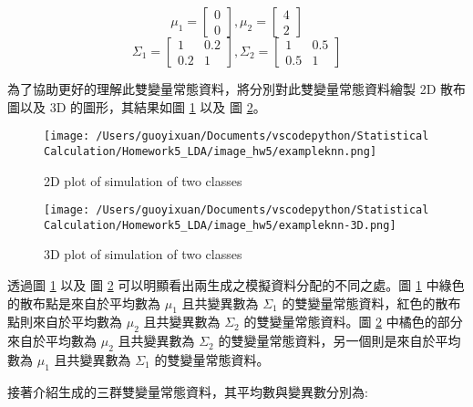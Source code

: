 $$ \mu_1 = \left[
            \begin{array}{clr}
                0  \\
                0 
            \end{array} \right] ,
            \mu_2 = \left[
            \begin{array}{clr}
                4  \\
                2 
            \end{array} \right] $$ 
$$ \Sigma_1 = \left[
            \begin{array}{clr}
                1 & 0.2  \\
                0.2 & 1
            \end{array} \right] ,
            \Sigma_2 = \left[
            \begin{array}{clr}
                1 & 0.5  \\
                0.5 & 1 
            \end{array} \right]  $$  

為了協助更好的理解此雙變量常態資料，將分別對此雙變量常態資料繪製 2D 散布圖以及 3D 的圖形，其結果如圖 \ref{fig:knn2D} 以及 圖 \ref{fig:knn3D}。

\begin{figure}[H]
    \centering
        \texttt{[image: /Users/guoyixuan/Documents/vscodepython/Statistical Calculation/Homework5\_LDA/image\_hw5/exampleknn.png]}
    \caption{2D plot of simulation of two classes}
    \label{fig:knn2D}
\end{figure} 

\begin{figure}[H]
    \centering
        \texttt{[image: /Users/guoyixuan/Documents/vscodepython/Statistical Calculation/Homework5\_LDA/image\_hw5/exampleknn-3D.png]}
    \caption{3D plot of simulation of two classes}
    \label{fig:knn3D}
\end{figure} 

透過圖 \ref{fig:knn2D} 以及 圖 \ref{fig:knn3D} 可以明顯看出兩生成之模擬資料分配的不同之處。圖 \ref{fig:knn2D} 中綠色的散布點是來自於平均數為 $\mu_1$ 且共變異數為 $\Sigma_1$ 的雙變量常態資料，紅色的散布點則來自於平均數為 $\mu_2$ 且共變異數為 $\Sigma_2$ 的雙變量常態資料。圖 \ref{fig:knn3D} 中橘色的部分來自於平均數為 $\mu_2$ 且共變異數為 $\Sigma_2$ 的雙變量常態資料，另一個則是來自於平均數為 $\mu_1$ 且共變異數為 $\Sigma_1$ 的雙變量常態資料。

接著介紹生成的三群雙變量常態資料，其平均數與變異數分別為:


